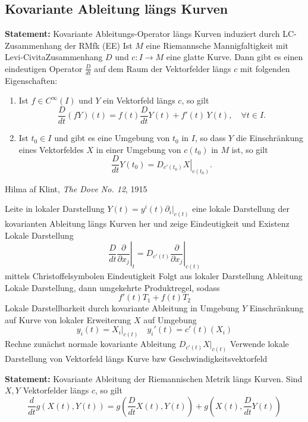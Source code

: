 \documentclass[10pt, letterpaper]{article}
\begin{document}
\subsection{Kovariante Ableitung längs Kurven}


\textbf{Statement: }{Kovariante Ableitungs-Operator längs Kurven induziert durch LC-Zusammenhang der RMfk (EE)}
Ist $M$ eine Riemannsche Mannigfaltigkeit mit Levi-CivitaZusammenhang $D$ und $c: I \rightarrow M$ eine glatte Kurve. Dann gibt es einen eindeutigen Operator $\frac{D}{d t}$ auf dem Raum der Vektorfelder längs $c$ mit folgenden Eigenschaften:
\begin{enumerate}
  \item Ist $f \in C^{\infty}(I)$ und $Y$ ein Vektorfeld längs $c$, so gilt
  \[
  \frac{D}{dt}(f Y)(t) = f(t) \frac{D}{dt} Y(t) + f'(t)\, Y(t), \quad \forall t \in I.
  \]
  
  \item Ist $t_0 \in I$ und gibt es eine Umgebung von $t_0$ in $I$, so dass $Y$ die Einschränkung eines Vektorfeldes $X$ in einer Umgebung von $c(t_0)$ in $M$ ist, so gilt
  \[
  \frac{D}{dt} Y(t_0) = \left. D_{c'(t_0)} X \right|_{c(t_0)}.
  \]
\end{enumerate}


  {Hilma af Klint, \emph{The Dove No. 12}, 1915}
{%
  \begin{outline}
  Leite in lokaler Darstellung $Y(t)=y^i(t)\partial_i|_{c(t)}$ eine lokale Darstellung der kovarianten Ableitung längs Kurven her und zeige Eindeutigkeit und Existenz
  \1 Lokale Darstellung
  \2 $$\left.\frac{D}{dt}\frac{\partial}{\partial x_j}\right|_{t}
      =\left.D_{c'(t)}\frac{\partial}{\partial x_j}\right|_{c(t)}$$ mittels Christoffelsymbolen
  \1 Eindeutigkeit
  \2 Folgt aus lokaler Darstellung
  \1 Ableitung
  \2 Lokale Darstellung, dann umgekehrte Produktregel, sodass 
  $$f'(t)T_1+f(t)T_2$$
  \1 Lokale Darstellbarkeit durch kovariante Ableitung in Umgebung
  \2 $Y$ Einschränkung auf Kurve von lokaler Erweiterung $X$ auf Umgebung 
  \3 $$y_i(t)=X_i|_{c(t)} \quad y_i'(t)=c'(t)(X_i)$$
  \2 Rechne zunächst normale kovariante Ableitung $D_{c'(t)} X|_{c(t)}$ 
  \2 Verwende lokale Darstellung von Vektorfeld längs Kurve bzw Geschwindigkeitsvektorfeld 
\end{outline}
}





\vspace{0.5cm}

\textbf{Statement: }{Kovariante Ableitung der Riemannischen Metrik längs Kurven}.
Sind $X,Y$ Vektorfelder längs $c$, so gilt
$$
\frac{d}{d t} g(X(t), Y(t))=g\left(\frac{D}{d t} X(t), Y(t)\right)+g\left(X(t), \frac{D}{d t} Y(t)\right)
$$
\end{document}
